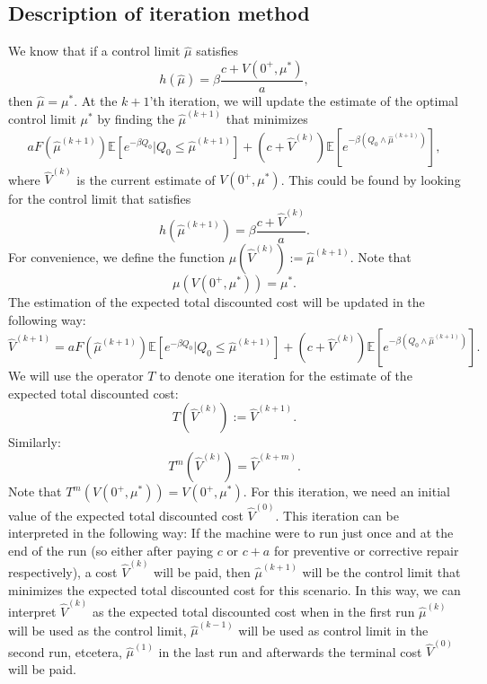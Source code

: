 \subsection{Description of iteration method}\label{section:AgeBasedIterationDescription}
We know that if a control limit $\hat{\mu}$ satisfies
\[h(\hat{\mu})=\beta\frac{c+V(0^+,\mu^*)}{a},\]
then $\hat{\mu}=\mu^*$.
At the $k+1$'th iteration, we will update the estimate of the optimal control limit $\mu^*$ by finding the $\hat{\mu}^{(k+1)}$ that minimizes
\[
aF(\hat{\mu}^{(k+1)})\mathbb{E}[e^{-\beta Q_0}|Q_0\leq \hat{\mu}^{(k+1)}]+(c+\hat{V}^{(k)})\mathbb{E}[e^{-\beta(Q_0\wedge\hat{\mu}^{(k+1)})}],
\]
where $\hat{V}^{(k)}$ is the current estimate of $V(0^+,\mu^*)$.
This could be found by looking for the control limit that satisfies
\begin{equation}\label{eq:AgeBasedIterationBound}
h(\hat{\mu}^{(k+1)})=\beta\frac{c+\hat{V}^{(k)}}{a}.\end{equation}
For convenience, we define the function $\mu(\hat{V}^{(k)}):=\hat{\mu}^{(k+1)}$.
Note that 
\begin{equation}\label{eq:AgeBasedIterationControlConvergence}
\mu(V(0^+,\mu^*))=\mu^*.
\end{equation}
The estimation of the expected total discounted cost will be updated in the following way:
\[\hat{V}^{(k+1)}=aF(\hat{\mu}^{(k+1)})\mathbb{E}[e^{-\beta Q_0}|Q_0\leq \hat{\mu}^{(k+1)}]+(c+\hat{V}^{(k)})\mathbb{E}[e^{-\beta(Q_0\wedge\hat{\mu}^{(k+1)})}].\]
We will use the operator $T$ to denote one iteration for the estimate of the expected total discounted cost:
\[T(\hat{V}^{(k)}):=\hat{V}^{(k+1)}.\]
Similarly:
\[T^m(\hat{V}^{(k)})=\hat{V}^{(k+m)}.\]
Note that $T^m(V(0^+,\mu^*))=V(0^+,\mu^*)$.
For this iteration, we need an initial value of the expected total discounted cost $\hat{V}^{(0)}$.
This iteration can be interpreted in the following way:
If the machine were to run just once and at the end of the run (so either after paying $c$ or $c+a$ for preventive or corrective repair respectively), a cost $\hat{V}^{(k)}$ will be paid, then $\hat{\mu}^{(k+1)}$ will be the control limit that minimizes the expected total discounted cost for this scenario.
In this way, we can interpret $\hat{V}^{(k)}$ as the expected total discounted cost when in the first run $\hat{\mu}^{(k)}$ will be used as the control limit, $\hat{\mu}^{(k-1)}$ will be used as control limit in the second run, etcetera, $\hat{\mu}^{(1)}$ in the last run and afterwards the terminal cost $\hat{V}^{(0)}$ will be paid.

